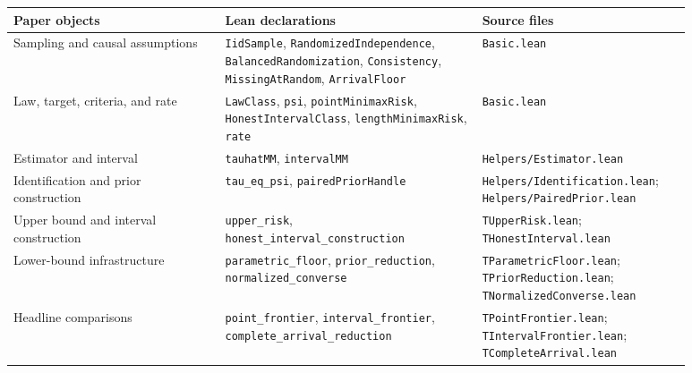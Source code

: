 \begin{center}
\small
\begin{tabular}{p{0.29\linewidth}p{0.34\linewidth}p{0.25\linewidth}}
\toprule
Paper objects & Lean declarations & Source files \\
\midrule
Sampling and causal assumptions & \texttt{IidSample}, \texttt{RandomizedIndependence}, \texttt{BalancedRandomization}, \texttt{Consistency}, \texttt{MissingAtRandom}, \texttt{ArrivalFloor} & \texttt{Basic.lean} \\
Law, target, criteria, and rate & \texttt{LawClass}, \texttt{psi}, \texttt{pointMinimaxRisk}, \texttt{HonestIntervalClass}, \texttt{lengthMinimaxRisk}, \texttt{rate} & \texttt{Basic.lean} \\
Estimator and interval & \texttt{tauhatMM}, \texttt{intervalMM} & \texttt{Helpers/Estimator.lean} \\
Identification and prior construction & \texttt{tau\_eq\_psi}, \texttt{pairedPriorHandle} & \texttt{Helpers/Identification.lean}; \texttt{Helpers/PairedPrior.lean} \\
Upper bound and interval construction & \texttt{upper\_risk}, \texttt{honest\_interval\_construction} & \texttt{TUpperRisk.lean}; \texttt{THonestInterval.lean} \\
Lower-bound infrastructure & \texttt{parametric\_floor}, \texttt{prior\_reduction}, \texttt{normalized\_converse} & \texttt{TParametricFloor.lean}; \texttt{TPriorReduction.lean}; \texttt{TNormalizedConverse.lean} \\
Headline comparisons & \texttt{point\_frontier}, \texttt{interval\_frontier}, \texttt{complete\_arrival\_reduction} & \texttt{TPointFrontier.lean}; \texttt{TIntervalFrontier.lean}; \texttt{TCompleteArrival.lean} \\
\bottomrule
\end{tabular}
\end{center}
